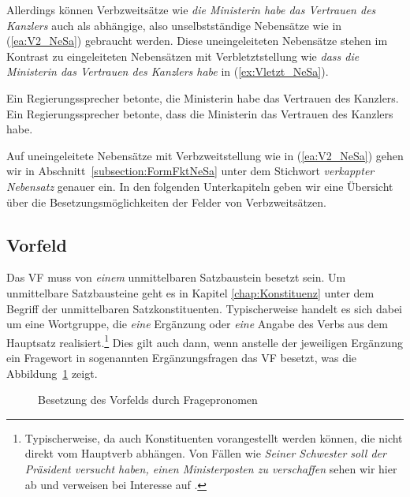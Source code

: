 Allerdings können Verbzweitsätze wie \textit{die Ministerin habe das Vertrauen des Kanzlers} auch als abhängige, also unselbstständige Nebensätze wie in (\ref{ea:V2_NeSa}) gebraucht werden. Diese uneingeleiteten Nebensätze stehen im Kontrast zu eingeleiteten Nebensätzen mit Verbletztstellung wie \textit{dass die Ministerin das Vertrauen des Kanzlers habe} in (\ref{ex:Vletzt_NeSa}). 

\ea \label{ea:V2vsVletzt}
\ea \label{ea:V2_NeSa} Ein Regierungssprecher betonte, die Ministerin habe das Vertrauen des Kanzlers.
\ex \label{ex:Vletzt_NeSa} Ein Regierungssprecher betonte, dass die Ministerin das Vertrauen des Kanzlers habe.
\z
\z 

Auf uneingeleitete Nebensätze mit Verbzweitstellung wie in (\ref{ea:V2_NeSa}) gehen wir in Abschnitt~\ref{subsection:FormFktNeSa} unter dem Stichwort \textit{verkappter Nebensatz} genauer ein. In den folgenden Unterkapiteln geben wir eine Übersicht über die Besetzungsmöglichkeiten der Felder von Verbzweitsätzen.

\subsection{Vorfeld}\label{subsection:Vorfeld}

Das VF muss von \textit{einem} unmittelbaren Satzbaustein besetzt sein. Um unmittelbare Satzbausteine geht es in Kapitel \ref{chap:Konstituenz} unter dem Begriff der unmittelbaren Satzkonstituenten. Typischerweise handelt es sich dabei um eine Wortgruppe, die \textit{eine} Ergänzung oder \textit{eine} Angabe des Verbs aus dem Hauptsatz realisiert.\footnote{Typischerweise, da auch Konstituenten vorangestellt werden können, die nicht direkt vom Hauptverb abhängen. Von Fällen wie \textit{Seiner Schwester soll der Präsident versucht haben, einen Ministerposten zu verschaffen} sehen wir hier ab und verweisen bei Interesse auf \citet[Kapitel 9]{Mueller1999}.} Dies gilt auch dann, wenn anstelle der jeweiligen Ergänzung ein Fragewort in sogenannten Ergänzungsfragen das VF besetzt, was die Abbildung~\ref{fig:FeldermodelV2mitW-Frage} zeigt.

\begin{figure}[!htbp]
  \centering
  \caption{Besetzung des Vorfelds durch Fragepronomen}
  \label{fig:FeldermodelV2mitW-Frage}
\end{figure}

